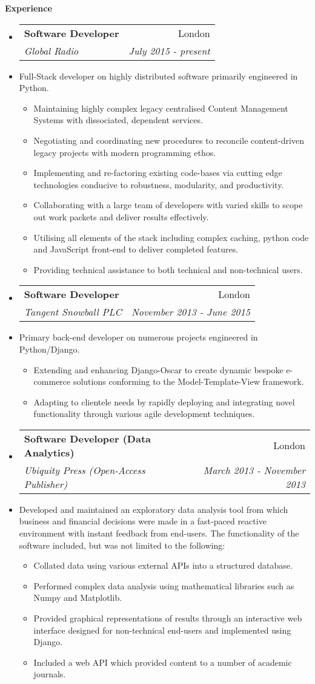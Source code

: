 \documentclass[letterpaper,11pt]{article}
\makeatletter
\newcommand{\resitem}[1]{\item #1 \vspace{-2pt}}
\newcommand{\resheading}[1]{{\large \colorbox{mygrey}
                            {\begin{minipage}{\textwidth}
                            {\textbf{#1 \vphantom{p\^{E}}}}
                            \end{minipage}}}
}
\newcommand{\ressubheading}[4]{
                \begin{tabular*}{180mm}{l@{\extracolsep{\fill}}r}
                \textbf{#1} & #2 \\
                \textit{#3} & \textit{#4} \\
                \end{tabular*}\vspace{-6pt}
}
\newcommand{\resdescription}[1]{#1 \vspace{-0mm}}
\makeatother
\begin{document}
\resheading{Experience}
\begin{itemize}

  \item[]
  \ressubheading{Software Developer}{London}{Global Radio}{July 2015 - present}
  \item[]
  \resdescription{Full-Stack developer on highly distributed software primarily engineered in Python.}
  \begin{itemize}
      \resitem{Maintaining highly complex legacy centralised Content Management Systems with dissociated, dependent services.}
      \resitem{Negotiating and coordinating new procedures to reconcile content-driven legacy projects with modern programming ethos.}
      \resitem{Implementing and re-factoring existing code-bases via cutting edge technologies conducive to robustness, modularity, and productivity.}
      \resitem{Collaborating with a large team of developers with varied skills to scope out work packets and deliver results effectively.}
      \resitem{Utilising all elements of the stack including complex caching, python code and JavaScript front-end to deliver completed features.}
      \resitem{Providing technical assistance to both technical and non-technical users.}
  \end{itemize}


  \item[]
  \ressubheading{Software Developer}{London}{Tangent Snowball PLC}{November 2013 - June 2015}
  \item[]
  \resdescription{Primary back-end developer on numerous projects engineered in Python/Django.}
  \begin{itemize}
    \resitem{Extending and enhancing Django-Oscar to create dynamic bespoke e-commerce solutions conforming to the Model-Template-View framework.}
    \resitem{Adapting to clientele needs by rapidly deploying and integrating novel functionality through various agile development techniques.}
  \end{itemize}

  \item[]
    \ressubheading{Software Developer (Data Analytics)}{London}{Ubiquity Press (Open-Access Publisher)}{March 2013 - November 2013}
    \item[]
     \resdescription{Developed and maintained an exploratory data analysis tool from which business and financial decisions were made in a fast-paced reactive environment with instant feedback from end-users. The functionality of the software included, but was not limited to the following:}
  \begin{itemize}
    \resitem{Collated data using various external APIs into a structured database.}
    \resitem{Performed complex data analysis using mathematical libraries such as Numpy and Matplotlib.}
    \resitem{Provided graphical representations of results through an interactive web interface designed for non-technical end-users and implemented using Django.}
    \resitem{Included a web API which provided content to a number of academic journals.}
  \end{itemize}


\end{itemize}
\end{document}
